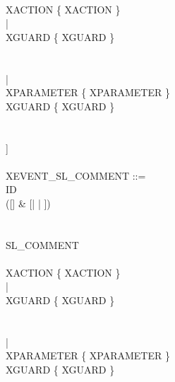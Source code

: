 \begin{center}
\begin{Bcode}
    \Btab \Btab {} \\
    \Btab \Btab \Btab \Bbegin{} XACTION \{ XACTION \} \\
    \Btab \Btab \Btab | \\
    \Btab \Btab \Btab \Bwhen{} XGUARD \{ XGUARD \}\\
    \Btab \Btab {} \\
    \Btab \Btab {} \\
    \Btab \Btab \Btab | \\
    \Btab \Btab \Btab \Bany{} XPARAMETER \{ XPARAMETER \}\\
    \Btab \Btab \Btab \Bwhere{} XGUARD \{ XGUARD \}\\
    \Btab \Btab {} \\
    \Btab \Btab {} \\
    \Btab \Btab ]\\
    \Btab \Btab \Bend\\
    XEVENT\_SL\_COMMENT ::=\\
    \Btab \Btab ID \\
    \Btab \Btab ([\Bextended] \& [\Bordinary | \Bconvergent | \Banticipated])\\
    \Btab {}\\
    \Btab \Btab [\Brefines{} ID \{ ID \}]\\
    \Btab \Btab SL\_COMMENT\\
    \Btab \Btab [\\
    \Btab \Btab \Btab [\Bwith{} XWITNESS \{ XWITNESS \}] \\
    \Btab \Btab \Btab \Bbegin{} XACTION \{ XACTION \} \\
    \Btab \Btab \Btab | \\
    \Btab \Btab \Btab \Bwhen{} XGUARD \{ XGUARD \}\\
    \Btab \Btab {} \\
    \Btab \Btab {} \\
    \Btab \Btab \Btab | \\
    \Btab \Btab \Btab \Bany{} XPARAMETER \{ XPARAMETER \}\\
    \Btab \Btab \Btab \Bwhere{} XGUARD \{ XGUARD \}\\
    \Btab \Btab {} \\
    \Btab \Btab {} \\

\end{Bcode}
\end{center}
